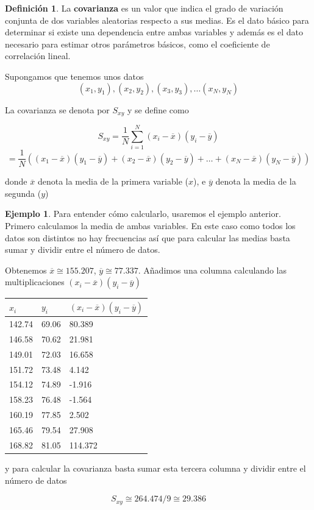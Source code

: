 \documentclass[]{book}
\theoremstyle{plain}
\theoremstyle{definition}
\newtheorem{definition}[theorem]{Definición}
\newtheorem{example}[theorem]{Ejemplo}
\begin{document}
 
\begin{definition}
  
La \textbf{covarianza} es un valor que indica el grado de variación
conjunta de dos variables aleatorias respecto a sus medias. Es el dato
básico para determinar si existe una dependencia entre ambas variables y
además es el dato necesario para estimar otros parámetros básicos, como
el coeficiente de correlación lineal.

Supongamos que tenemos unos datos
\[(x_1, y_1), (x_2, y_2), (x_3,y_3), \ldots (x_N,y_N)\]

La covarianza se denota por \(S_{xy}\) y se define como

\[ S_{xy} = \frac{1}{N}\sum^N_{i=1}(x_i - \overline{x})(y_i - \overline{y}) \]
\[ =\frac{1}{N}((x_1- \overline x)(y_1 - \overline y)+ (x_2- \overline x)(y_2 - \overline y)+ \ldots +(x_N- \overline x)(y_N - \overline y))\]

donde \(\overline x\) denota la media de la primera variable (\(x\)), e
\(\overline y\) denota la media de la segunda (\(y\))

\end{definition}


\begin{example}\label{ex_alturas}
  Para entender cómo calcularlo, usaremos el ejemplo anterior. Primero
calculamos la media de ambas variables. En este caso como todos los
datos son distintos no hay frecuencias así que para calcular las medias
basta sumar y dividir entre el número de datos.

Obtenemos \(\overline x \cong155.207\), \(\overline y \cong77.337\).
Añadimos una columna calculando las multiplicaciones
\((x_i - \overline{x})(y_i - \overline{y})\)

\begin{longtable}[]{@{}lll@{}}
\toprule
\(x_i\) & \(y_i\) &
\((x_i - \overline{x})(y_i - \overline{y})\)\tabularnewline
\midrule
\endhead
142.74 & 69.06 & 80.389\tabularnewline
146.58 & 70.62 & 21.981\tabularnewline
149.01 & 72.03 & 16.658\tabularnewline
151.72 & 73.48 & 4.142\tabularnewline
154.12 & 74.89 & -1.916\tabularnewline
158.23 & 76.48 & -1.564\tabularnewline
160.19 & 77.85 & 2.502\tabularnewline
165.46 & 79.54 & 27.908\tabularnewline
168.82 & 81.05 & 114.372\tabularnewline
\bottomrule
\end{longtable}

y para calcular la covarianza basta sumar esta tercera columna y dividir
entre el número de datos

\[S_{xy} \cong 264.474/9 \cong 29.386\]
\end{example}
\end{document}
